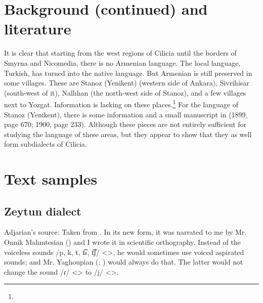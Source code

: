 \section{Background (continued) and literature}

It is clear that starting from the west regions of Cilicia until the borders of Smyrna and Nicomedia, there is no Armenian language. The local language, Turkish, has turned into the native language. But Armenian is still preserved in some villages. These are Stanoz (Yenikent) (western side of Ankara), Sivrihisar (south-west of it), Nallıhan (the north-west side of Stanoz), and a few villages next to Yozgat. Information is lacking on these places.\footnote{} For the language of Stanoz (Yenikent), there is some information and a small manuscript in  (1899, page 670; 1900, page 233). Although these pieces are not entirely sufficient for studying the language of these areas, but they appear to show that they as well form subdialects of Cilicia. 


\begin{adjarianpage}\label{page:206}\end{adjarianpage}%

\section{Text samples}

{\sampleoverview}

\subsection{Zeytun dialect}

Adjarian's source: Taken from \citet[159]{Allahverdian-1884-UlniaZeytun}. In its new form, it was narrated to me by Mr. Onnik Mahmtesian () and I wrote it in scientific orthography. Instead of the voiceless sounds /p, k, t, t͡s, t͡ʃ/ <>, he would sometimes use voiced aspirated sounds; and Mr. Yaghoupian (; ) would always do that. The latter would not change the sound /ɾ/ <> to /j/ <>. 


